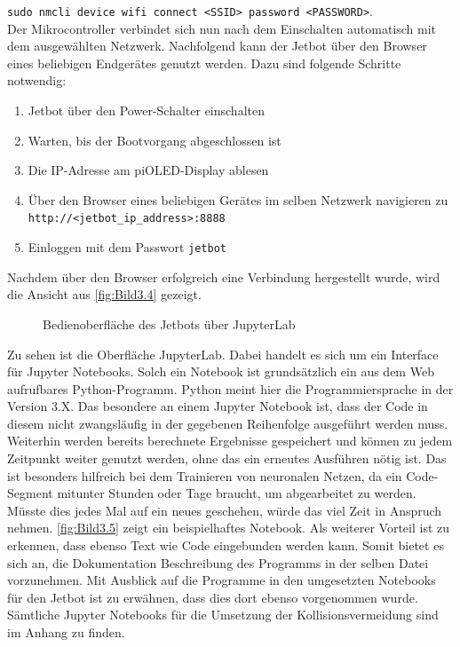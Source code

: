 \texttt{sudo nmcli device wifi connect <SSID> password <PASSWORD>}. \\

Der Mikrocontroller verbindet sich nun nach dem Einschalten automatisch mit dem ausgewählten Netzwerk. Nachfolgend kann der Jetbot über den Browser eines beliebigen Endgerätes genutzt werden. Dazu sind folgende Schritte notwendig:

\begin{enumerate}
    \item Jetbot über den Power-Schalter einschalten
    \item Warten, bis der Bootvorgang abgeschlossen ist
    \item Die IP-Adresse am piOLED-Display ablesen
    \item Über den Browser eines beliebigen Gerätes im selben Netzwerk navigieren zu \\\texttt{http://<jetbot_ip_address>:8888}
    \item Einloggen mit dem Passwort \texttt{jetbot}
\end{enumerate}

Nachdem über den Browser erfolgreich eine Verbindung hergestellt wurde, wird die Ansicht aus \autoref{fig:Bild3.4} gezeigt.

\begin{figure}[H]
    \centering
    \caption[Jetbot Bedienoberfläche]{Bedienoberfläche des Jetbots über JupyterLab}
    \label{fig:Bild3.4}
\end{figure}

Zu sehen ist die Oberfläche JupyterLab. Dabei handelt es sich um ein Interface für Jupyter Notebooks. Solch ein Notebook ist grundsätzlich ein aus dem Web aufrufbares Python-Programm. Python meint hier die Programmiersprache in der Version 3.X. Das besondere an einem Jupyter Notebook ist, dass der Code in diesem nicht zwangsläufig in der gegebenen Reihenfolge ausgeführt werden muss. Weiterhin werden bereits berechnete Ergebnisse gespeichert und können zu jedem Zeitpunkt weiter genutzt werden, ohne das ein erneutes Ausführen nötig ist. Das ist besonders hilfreich bei dem Trainieren von neuronalen Netzen, da ein Code-Segment mitunter Stunden oder Tage braucht, um abgearbeitet zu werden. Müsste dies jedes Mal auf ein neues geschehen, würde das viel Zeit in Anspruch nehmen. \autoref{fig:Bild3.5} zeigt ein beispielhaftes Notebook. Als weiterer Vorteil ist zu erkennen, dass ebenso Text wie Code eingebunden werden kann. Somit bietet es sich an, die Dokumentation \bzw Beschreibung des Programms in der selben Datei vorzunehmen. Mit Ausblick auf die Programme in den umgesetzten Notebooks für den Jetbot ist zu erwähnen, dass dies dort ebenso vorgenommen wurde. Sämtliche Jupyter Notebooks für die Umsetzung der Kollisionsvermeidung sind im Anhang zu finden.

